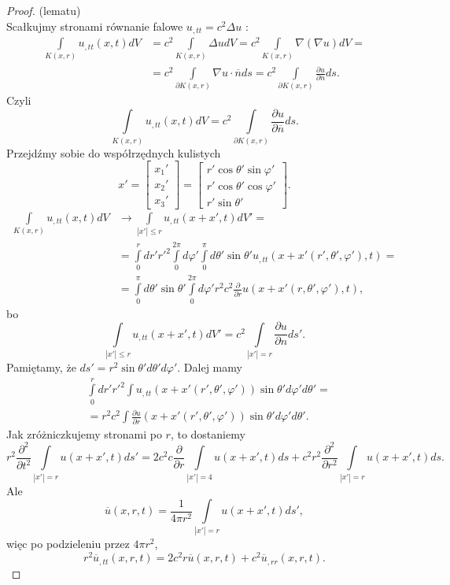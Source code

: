 \documentclass[../main.tex]{subfiles}
\begin{document}
		\begin{proof}
				(lematu)\\
				Scałkujmy stronami równanie falowe $u_{,t t} = c^2 \Delta u$ :
				\begin{align*}
						\int\limits_{K(x,r)}u_{,t t}(x,t)dV &= c^2 \int\limits_{K(x,r)}\Delta u dV = c^2 \int\limits_{K(x,r)}\nabla(\nabla u) dV = \\
						&= c^2 \int\limits_{\partial K(x,r)}\nabla u \cdot \overline{n} d s = c^2 \int\limits_{\partial K(x,r)}\frac{\partial u}{\partial \overline{n}} d s
				.\end{align*}
				Czyli
				\[
						\int\limits_{K(x,r)}u_{,t t}(x,t)dV = c^2 \int\limits_{\partial K(x,r)} \frac{\partial u}{\partial \overline{n} } d s
				.\]
				Przejdźmy sobie do współrzędnych kulistych
				\[
						x' = \begin{bmatrix} x_1'\\x_2'\\x_3' \end{bmatrix} = \begin{bmatrix} r'\cos\theta'\sin\varphi'\\
		r'\cos\theta'\cos\varphi'\\
		r'\sin\theta'
		\end{bmatrix}
				.\]
				\begin{align*}
						\int\limits_{K(x,r)}u_{,t t}(x,t)dV &\to \int\limits_{|x'|\le r}u_{,t t}(x+x',t)dV' =\\
						&= \int\limits_{0}^r dr' r'^2 \int\limits_{0}^{2\pi}d\varphi' \int\limits_0^{\pi}d\theta' \sin\theta' u_{,t t}(x+x'(r',\theta',\varphi'),t) = \\
						&= \int\limits_0^\pi d\theta'\sin\theta' \int\limits_0^{2\pi} d\varphi' r^2 c^2 \frac{\partial }{\partial r} u(x+x'(r,\theta',\varphi'),t)
				,\end{align*}
				bo
				\[
						\int\limits_{|x'|\le r}u_{,t t}(x+x', t)dV' = c^2 \int\limits_{|x'| = r}\frac{\partial u}{\partial n} d s'
				.\]
				Pamiętamy, że $d s' = r^2 \sin\theta' d\theta'd\varphi'$. Dalej mamy
				\begin{align*}
						&\int\limits_{0}^{r} dr' r'^2 \int u_{,t t}(x+x'(r',\theta',\varphi'))\sin\theta'd\varphi'd\theta' = \\
						&= r^2 c^2 \int\limits \frac{\partial u}{\partial r} (x+x'(r',\theta',\varphi'))\sin\theta'd\varphi'd\theta'
				.\end{align*}
				Jak zróżniczkujemy stronami po $r$, to dostaniemy
				\[
						r^2 \frac{\partial ^2}{\partial t^2} \int\limits_{|x'|=r}u(x+x',t)d s' = 2c^2c \frac{\partial }{\partial r} \int\limits_{|x'|=4}u(x+x',t)d s + c^2r^2 \frac{\partial ^2}{\partial r^2} \int\limits_{|x'|=r}u(x+x',t)d s
				.\]
				Ale
				\[
						\overline{u} (x,r,t) = \frac{1}{4\pi r^2}\int\limits_{|x'|=r}u(x+x',t)d s'
				,\]
				więc po podzieleniu przez $4\pi r^2$,
				\[
						r^2 \overline{u} _{,t t}(x,r,t) = 2c^2 r \overline{u} (x,r,t) + c^2 \overline{u} _{,r r}(x,r,t)
				.\]
		\end{proof}
\end{document}
